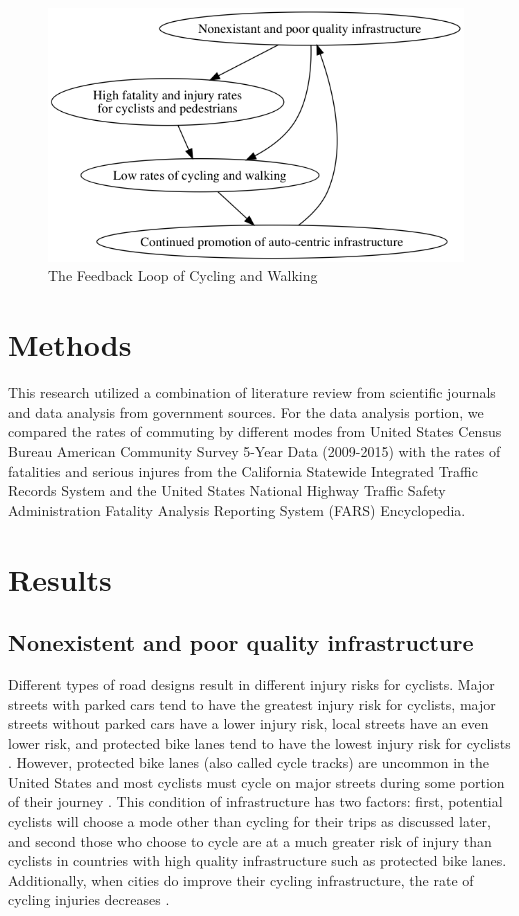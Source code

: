 \documentclass{article}
\begin{document}
\begin{figure}
    \centering
    \includegraphics[width=11cm]{feedbackloop}
    \caption{The Feedback Loop of Cycling and Walking}
    \label{fig:feedbackloop}
\end{figure}

\section*{Methods}
This research utilized a combination of literature review from scientific journals and data analysis from government sources. For the data analysis portion, we compared the rates of commuting by different modes from United States Census Bureau American Community Survey 5-Year Data (2009-2015) with the rates of fatalities and serious injures from the California Statewide Integrated Traffic Records System and the United States National Highway Traffic Safety Administration Fatality Analysis Reporting System (FARS) Encyclopedia.

\section*{Results}

\subsection*{Nonexistent and poor quality infrastructure}
Different types of road designs result in different injury risks for cyclists. Major streets with parked cars tend to have the greatest injury risk for cyclists, major streets without parked cars have a lower injury risk, local streets have an even lower risk, and protected bike lanes tend to have the lowest injury risk for cyclists \citep[Page 2340]{teschke2012}. However, protected bike lanes (also called cycle tracks) are uncommon in the United States and most cyclists must cycle on major streets during some portion of their journey \citep[Page 2-3]{mekuria2012}. This condition of infrastructure has two factors: first, potential cyclists will choose a mode other than cycling for their trips as discussed later, and second those who choose to cycle are at a much greater risk of injury than cyclists in countries with high quality infrastructure such as protected bike lanes. Additionally, when cities do improve their cycling infrastructure, the rate of cycling injuries decreases \citep[Page 2173]{pedroso2016} \citep[Page 2090]{pucher2016}.
\end{document}
